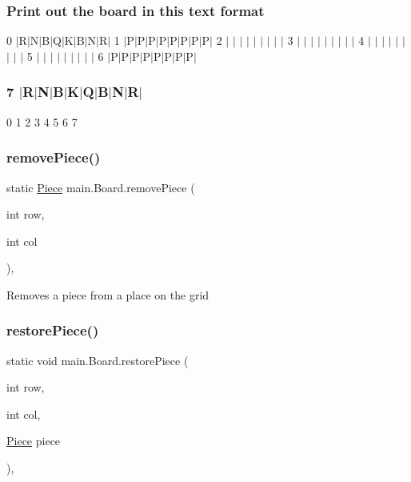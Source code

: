 \subsubsection*{Print out the board in this text format }

0 $\vert$\+R$\vert$\+N$\vert$\+B$\vert$\+Q$\vert$\+K$\vert$\+B$\vert$\+N$\vert$\+R$\vert$ 1 $\vert$\+P$\vert$\+P$\vert$\+P$\vert$\+P$\vert$\+P$\vert$\+P$\vert$\+P$\vert$\+P$\vert$ 2 $\vert$ $\vert$ $\vert$ $\vert$ $\vert$ $\vert$ $\vert$ $\vert$ $\vert$ 3 $\vert$ $\vert$ $\vert$ $\vert$ $\vert$ $\vert$ $\vert$ $\vert$ $\vert$ 4 $\vert$ $\vert$ $\vert$ $\vert$ $\vert$ $\vert$ $\vert$ $\vert$ $\vert$ 5 $\vert$ $\vert$ $\vert$ $\vert$ $\vert$ $\vert$ $\vert$ $\vert$ $\vert$ 6 $\vert$\+P$\vert$\+P$\vert$\+P$\vert$\+P$\vert$\+P$\vert$\+P$\vert$\+P$\vert$\+P$\vert$ \subsubsection*{7 $\vert$\+R$\vert$\+N$\vert$\+B$\vert$\+K$\vert$\+Q$\vert$\+B$\vert$\+N$\vert$\+R$\vert$ }

0 1 2 3 4 5 6 7 \mbox{\label{classmain_1_1_board_a110748d6dfcc0e2bedce2053fb0c94b1}} 
\subsubsection{\texorpdfstring{remove\+Piece()}{removePiece()}}
{\footnotesize\ttfamily static \hyperlink{classmain_1_1pieces_1_1_piece}{Piece} main.\+Board.\+remove\+Piece (\begin{DoxyParamCaption}\item[{int}]{row,  }\item[{int}]{col }\end{DoxyParamCaption})\hspace{0.3cm}{\ttfamily [inline]}, {\ttfamily [static]}}

Removes a piece from a place on the grid \mbox{\label{classmain_1_1_board_ac6cfd9f1f525312395d060f9491d4fc7}} 
\subsubsection{\texorpdfstring{restore\+Piece()}{restorePiece()}}
{\footnotesize\ttfamily static void main.\+Board.\+restore\+Piece (\begin{DoxyParamCaption}\item[{int}]{row,  }\item[{int}]{col,  }\item[{\hyperlink{classmain_1_1pieces_1_1_piece}{Piece}}]{piece }\end{DoxyParamCaption})\hspace{0.3cm}{\ttfamily [inline]}, {\ttfamily [static]}}

